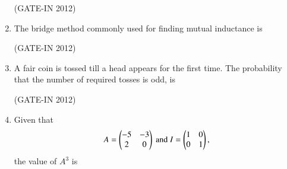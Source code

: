 \documentclass[journal,12pt,onecolumn]{IEEEtran}
\theoremstyle{remark}
\begin{document}
\begin{enumerate}
\hfill{(GATE-IN 2012)}
\begin{enumerate}
\end{enumerate}

\item The bridge method commonly used for finding mutual inductance is

\hfill{(GATE-IN 2012)}
\begin{enumerate}
\end{enumerate}

\item A fair coin is tossed till a head appears for the first time. The probability that the number of required tosses is odd, is

\hfill{(GATE-IN 2012)}
\begin{enumerate}
\end{enumerate}

\item Given that
\begin{align}
A = \begin{pmatrix}-5 & -3 \\ 2 & 0\end{pmatrix}\text{ and }I = \begin{pmatrix}1 & 0 \\ 0 & 1\end{pmatrix},
\end{align}
the value of $A^3$ is


\end{enumerate}
\end{document}
